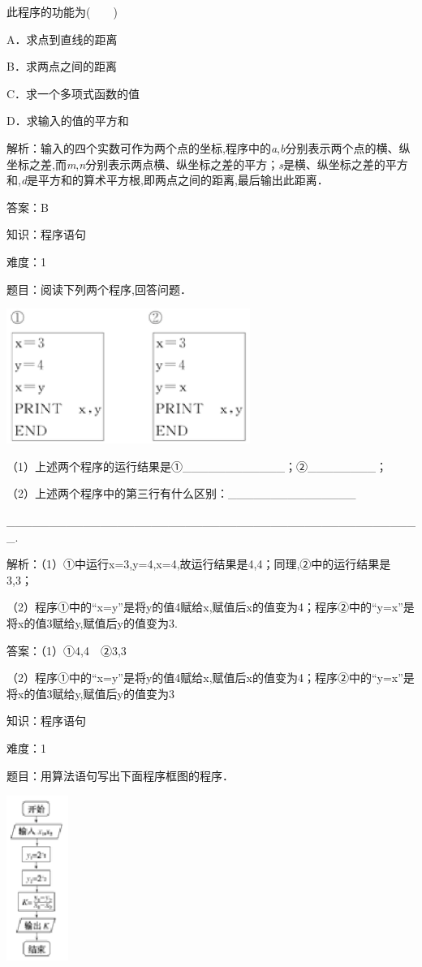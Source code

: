 \documentclass{article} %
\begin{document}
此程序的功能为(　　)

A．求点到直线的距离

B．求两点之间的距离

C．求一个多项式函数的值

D．求输入的值的平方和

解析：输入的四个实数可作为两个点的坐标,程序中的\textit{a},\textit{b}分别表示两个点的横、纵坐标之差,而\textit{m},\textit{n}分别表示两点横、纵坐标之差的平方；\textit{s}是横、纵坐标之差的平方和,\textit{d}是平方和的算术平方根,即两点之间的距离,最后输出此距离．

答案：B

知识：程序语句

难度：1

题目：阅读下列两个程序,回答问题．

\includegraphics*[width=3.13in, height=1.73in, keepaspectratio=false]{image39}

（1）上述两个程序的运行结果是①\_\_\_\_\_\_\_\_\_\_\_\_；②\_\_\_\_\_\_\_\_；

（2）上述两个程序中的第三行有什么区别：\_\_\_\_\_\_\_\_\_\_\_\_\_\_\_

\_\_\_\_\_\_\_\_\_\_\_\_\_\_\_\_\_\_\_\_\_\_\_\_\_\_\_\_\_\_\_\_\_\_\_\_\_\_\_\_\_\_\_\_\_\_\_\_\_.

解析：（1）①中运行x=3,y=4,x=4,故运行结果是4,4；同理,②中的运行结果是3,3；

（2）程序①中的``x=y''是将y的值4赋给x,赋值后x的值变为4；程序②中的``y=x''是将x的值3赋给y,赋值后y的值变为3.

答案：（1）①4,4　②3,3

（2）程序①中的``x=y''是将y的值4赋给x,赋值后x的值变为4；程序②中的``y=x''是将x的值3赋给y,赋值后y的值变为3

知识：程序语句

难度：1

题目：用算法语句写出下面程序框图的程序．

\includegraphics*[width=0.79in, height=2.13in, keepaspectratio=false]{image40}
\end{document}
